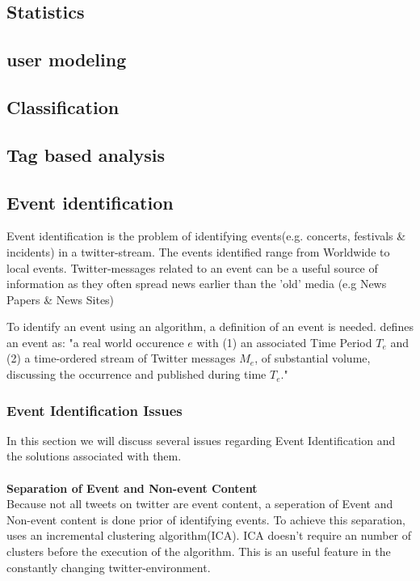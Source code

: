 \documentclass{article}
\begin{document}
\subsection{Statistics}
\subsection{user modeling}
\subsection{Classification}
\subsection{Tag based analysis}
\subsection{Event identification}

Event identification is the problem of identifying events(e.g. concerts, festivals \& incidents) in a twitter-stream. The events identified range from Worldwide to local events. Twitter-messages related to an event can be a useful source of information as they often spread news earlier than the 'old' media (e.g News Papers \& News Sites)

To identify an event using an algorithm, a definition of an event is needed. \cite{eventident} defines an event as: "a real world occurence $e$ with (1) an associated Time Period $T_e$ and (2) a time-ordered stream of Twitter messages $M_e$, of substantial volume, discussing the
occurrence and published during time $T_e$."

\subsubsection{Event Identification Issues}
In this section we will discuss several issues regarding Event Identification and the solutions associated with them.
\\\\ 
\textbf{Separation of Event and Non-event Content}\\
Because not all tweets on twitter are event content, a seperation of Event and Non-event content is done prior of identifying events. To achieve this separation, \cite{eventident} uses an incremental clustering algorithm(ICA). ICA doesn't require an number of clusters before the execution of the algorithm. This is an useful feature in the constantly changing twitter-environment.
\end{document}
